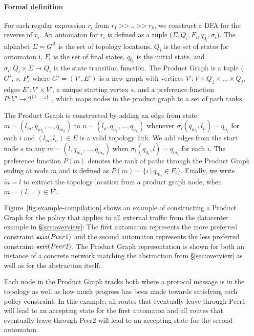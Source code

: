 \documentclass{sig-alternate-10pt}
\newcommand{\para}[1]{\paragraph*{\textbf{#1}}}
\newcommand{\set}[1]{\ensuremath{\{ #1 \} }}
\newcommand{\CD}[1]{\texttt{\small #1}}  %
\newcommand{\KW}[1]{\texttt{\small\bfseries{#1}}}
\newcommand{\True}{\CD{true}}
\newcommand{\Prefer}{\texttt{>>}}
\newcommand{\Path}{\texttt{=>}}
\newcommand{\Exit}{\KW{exit}}
\begin{document}
\para{Formal definition}

For each regular expression $r_i$ from $r_1 ~\Prefer~ .. ~\Prefer~ r_k$, we construct a DFA for the reverse of $r_i$. An automaton for $r_i$ is defined as a tuple ($\Sigma, Q_i, F_i, q_{0_i}, \sigma_i$). The alphabet $\Sigma = G^A$ is the set of topology locations, $Q_i$ is the set of states for automaton i, $F_i$ is the set of final states, $q_{0_i}$ is the initial state, and $\sigma_i \colon Q_i \times \Sigma \rightarrow Q_i$ is the state transition function.
%
The Product Graph is a tuple ($G'$, $s$, $P$) where $G' = (V',E')$ is a new graph with
vertices $V' \colon V \times Q_1 \times \dots \times Q_j$,
edges $E' \colon V' \times V'$,
a unique starting vertex $s$,
and a preference function $P \colon V' \rightarrow 2^{\set{1, \dots, j}}$ , which maps nodes in the product graph to a set of path ranks.

The Product Graph is constructed by adding an edge from state $m = (l_m, q_{m_1}, \dots, q_{m_k})$ to $n = (l_n, q_{n_1}, \dots, q_{n_k})$ whenever $\sigma_i(q_{m_i}, l_n) = q_{n_i}$ for each $i$ and $(l_m,l_n) \in E$ is a valid topology link.
%
We add edges from the start node $s$ to any $m = (l, q_{m_1}, \dots, q_{m_k})$ when $\sigma_i(q_{0_i}, l) = q_{m_i}$ for each $i$.
%
The preference function $P(m)$ denotes the rank of paths through the Product Graph ending at node $m$ and is defined as $P(m) = \set{i~\vert~q_{m_i} \in F_i}$.
%
Finally, we write $\tilde{m} = l$ to extract the topology location from a product graph node, when $m = (l, \dots) \in V'$.

Figure~\ref{fig:example-compilation} shows an example of constructing a Product Graph for the policy that applies to all external traffic from the datacenter example in \S\ref{sec:overview}:
%
%
The first automaton represents the more preferred constraint $\Exit(Peer1)$ and the second automaton represents the less preferred constraint $\Exit(Peer2)$. The Product Graph representation is shown for both an instance of a concrete network matching the abstraction from \S\ref{sec:overview} as well as for the abstraction itself.

Each node in the Product Graph tracks both where a protocol message is in the topology as well as how much progress has been made towards satisfying each policy constraint. In this example, all routes that eventually leave through Peer1 will lead to an accepting state for the first automaton and all routes that eventually leave through Peer2 will lead to an accepting state for the second automaton.
\end{document}
